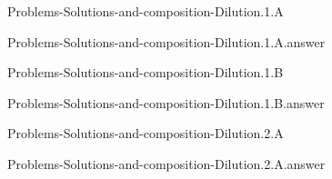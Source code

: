 \documentclass[main.tex]{subfiles}
\newcommand\chapterlabel{}
\begin{document}
\renewcommand\chapterlabel{Ch-electrolytes}
\begin{question}[ID=\the\value{numA}]
{Problems-Solutions-and-composition-Dilution.1.A}
\end{question}
   \begin{Form}
   \TextField[multiline,backgroundcolor=gray!20,borderwidth=0,width=0.43\textwidth  ,height=115pt, name=\the\value{numA}]  { }\end{Form}
\begin{solution}
{Problems-Solutions-and-composition-Dilution.1.A.answer}
\hspace{0.1cm}
\end{solution}


\renewcommand\chapterlabel{Ch-electrolytes}
\begin{question}[ID=\the\value{numA}]
{Problems-Solutions-and-composition-Dilution.1.B}
\end{question}
   \begin{Form}
   \TextField[multiline,backgroundcolor=gray!20,borderwidth=0,width=0.43\textwidth  ,height=115pt, name=\the\value{numA}]  { }\end{Form}
\begin{solution}
{Problems-Solutions-and-composition-Dilution.1.B.answer}
\hspace{0.1cm}
\end{solution}
%
%
\renewcommand\chapterlabel{Ch-electrolytes}
\begin{question}[ID=\the\value{numA}]
{Problems-Solutions-and-composition-Dilution.2.A}
\end{question}
   \begin{Form}
   \TextField[multiline,backgroundcolor=gray!20,borderwidth=0,width=0.43\textwidth  ,height=115pt, name=\the\value{numA}]  { }\end{Form}
\begin{solution}
{Problems-Solutions-and-composition-Dilution.2.A.answer}
\hspace{0.1cm}
\end{solution}
\end{document}
